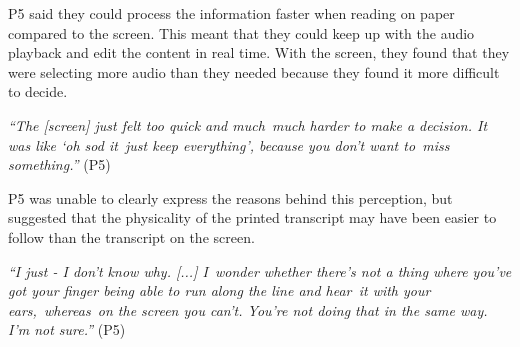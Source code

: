 P5 said they could process the information faster when reading on paper compared to the screen. This meant that they
could keep up with the audio playback and edit the content in real time. With the screen, they found that they were
selecting more audio than they needed because they found it more difficult to decide.

\textit{``The [screen] just felt too quick and much much harder to make a decision. It was like `oh sod it just keep
everything', because you don't want to miss something.''} (P5)

P5 was unable to clearly express the reasons behind this perception, but suggested that the physicality of the printed
transcript may have been easier to follow than the transcript on the screen.

\textit{``I just - I don't know why. [...] I wonder whether there's not a thing where you've got your finger being able
to run along the line and hear it with your ears, whereas on the screen you can't. You're not doing that in the same
way. I'm not sure.''} (P5) 







